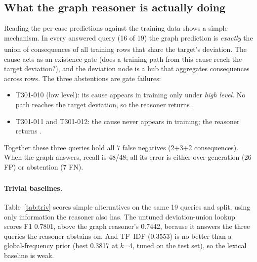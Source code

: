 \documentclass[10pt,twocolumn,a4paper]{extarticle}
\newcommand{\derived}{\textsuperscript{\textdagger}}
\begin{document}
\subsection{What the graph reasoner is actually doing}\label{sec:lookup}
Reading the per-case predictions against the training data shows a simple mechanism. In every answered query (16 of 19) the graph prediction is \emph{exactly} the union of consequences of all training rows that share the target's deviation.\derived{} The cause acts as an existence gate (does a training path from this cause reach the target deviation?), and the deviation node is a hub that aggregates consequences across rows. The three abstentions are gate failures:
\begin{itemize}
  \item T301-010 (low level): its cause  appears in training only under \emph{high level}. No path reaches the target deviation, so the reasoner returns .
  \item T301-011 and T301-012: the cause  never appears in training; the reasoner returns .
\end{itemize}
Together these three queries hold all 7 false negatives (2+3+2 consequences). When the graph answers, recall is 48/48; all its error is either over-generation (26 FP) or abstention (7 FN).

\paragraph{Trivial baselines\derived{}.} Table~\ref{tab:triv} scores simple alternatives on the same 19 queries and split, using only information the reasoner also has. The untuned deviation-union lookup scores F1 0.7801, above the graph reasoner's 0.7442, because it answers the three queries the reasoner abstains on. And TF--IDF (0.3553) is no better than a global-frequency prior (best 0.3817 at $k$=4, tuned on the test set), so the lexical baseline is weak.
\end{document}
